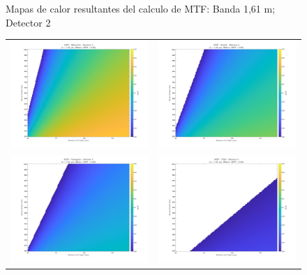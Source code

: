 \begin{landscape}
\begin{figure}[p]
\caption{Mapas de calor resultantes del calculo de MTF: Banda 1,61 \textmu m; Detector 2}
\end{figure}
\end{landscape}


\begin{landscape}
\begin{figure}[p]
\centering
\setlength{\tabcolsep}{2pt}
\renewcommand{\arraystretch}{0}

\begin{tabular}{cc}
\includegraphics[width=0.48\linewidth]{4.Payload/MTF/MTF_Lambda1_Detector3_Telescopio1_heatmap.jpg} &
\includegraphics[width=0.48\linewidth]{4.Payload/MTF/MTF_Lambda1_Detector3_Telescopio2_heatmap.jpg} \\
\includegraphics[width=0.48\linewidth]{4.Payload/MTF/MTF_Lambda1_Detector3_Telescopio3_heatmap.jpg} &
\includegraphics[width=0.48\linewidth]{4.Payload/MTF/MTF_Lambda1_Detector3_Telescopio4_heatmap.jpg} \\
\end{tabular}


\end{figure}
\end{landscape}
